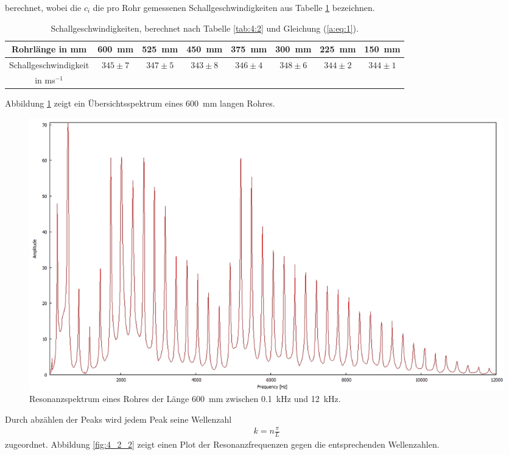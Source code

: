 berechnet, wobei die $c_i$ die pro Rohr gemessenen Schallgeschwindigkeiten aus Tabelle \ref{tab:4:3} bezeichnen.
\begin{table}
\centering
\caption{Schallgeschwindigkeiten, berechnet nach Tabelle \ref{tab:4:2} und Gleichung (\ref{a:eq:1}).}
\label{tab:4:3}
\begin{tabular}{c c c c c c c c}
\hline
Rohrlänge in mm &600~mm&525~mm&450~mm&375~mm&300~mm& 225~mm& 150~mm \\ \hline
Schallgeschwindigkeit &$345\pm 7$&$347\pm 5$&$343\pm 8$&$346\pm 4$&$348\pm 6$&$344\pm 2$&$344\pm 1$\\
in ms$^{-1}$&&&&&&&\\
\hline
\end{tabular}
\end{table}
\FloatBarrier
Abbildung \ref{fig:4_2_1} zeigt ein Übersichtsspektrum eines 600~mm langen Rohres.
\begin{figure}
\centering
\includegraphics[width=1\textwidth]{content/messungen/Chapter4/4_2.jpg}
\caption{Resonanzspektrum eines Rohres der Länge 600~mm zwischen 0.1~kHz und 12~kHz.}
\label{fig:4_2_1}
\end{figure}
Durch abzählen der Peaks wird jedem Peak seine Wellenzahl
\begin{align}
k= n\frac{\pi}{L}
\end{align}
zugeordnet.
Abbildung \ref{fig:4_2_2} zeigt einen Plot der Resonanzfrequenzen gegen die entsprechenden Wellenzahlen.
